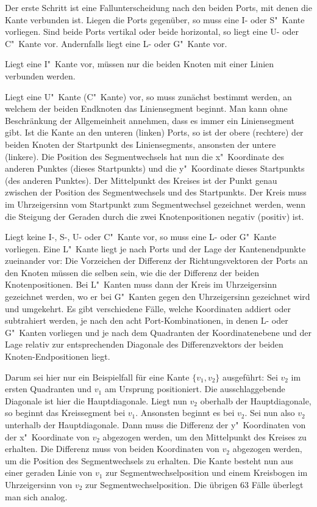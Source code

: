 \documentclass[a4paper]{scrreprt}
\theoremstyle{definition}
\begin{document}
Der erste Schritt ist eine Fallunterscheidung nach den beiden Ports, mit denen die Kante verbunden ist. Liegen die Ports gegenüber, so muss eine I- oder S"~Kante vorliegen. Sind beide Ports vertikal oder beide horizontal, so liegt eine U- oder C"~Kante vor. Andernfalls liegt eine L- oder G"~Kante vor.

Liegt eine I"~Kante vor, müssen nur die beiden Knoten mit einer Linien verbunden werden. %

Liegt eine U"~Kante (C"~Kante) vor, so muss zunächst bestimmt werden, an welchem der beiden Endknoten das Liniensegment beginnt. Man kann ohne Beschränkung der Allgemeinheit annehmen, dass es immer ein Liniensegment gibt. Ist die Kante an den unteren (linken) Ports, so ist der obere (rechtere) der beiden Knoten der Startpunkt des Liniensegments, ansonsten der untere  (linkere). Die Position des Segmentwechsels hat nun die x"~Koordinate des anderen Punktes (dieses Startpunkts) und die y"~Koordinate dieses Startpunkts (des anderen Punktes). Der Mittelpunkt des Kreises ist der Punkt genau zwischen der Position des Segmentwechsels und des Startpunkts. Der Kreis muss im Uhrzeigersinn vom Startpunkt zum Segmentwechsel gezeichnet werden, wenn die Steigung der Geraden durch die zwei Knotenpositionen negativ (positiv) ist.

Liegt keine I-, S-, U- oder C"~Kante vor, so muss eine L- oder G"~Kante vorliegen. Eine L"~Kante liegt je nach Ports und der Lage der Kantenendpunkte zueinander vor: Die Vorzeichen der Differenz der Richtungsvektoren der Ports an den Knoten müssen die selben sein, wie die der Differenz der beiden Knotenpositionen. Bei L"~Kanten muss dann der Kreis im Uhrzeigersinn gezeichnet werden, wo er bei G"~Kanten gegen den Uhrzeigersinn gezeichnet wird und umgekehrt. Es gibt verschiedene Fälle, welche Koordinaten addiert oder subtrahiert werden, je nach den acht Port-Kombinationen, in denen  L- oder G"~Kanten vorliegen und je nach dem Quadranten der Koordinatenebene und der Lage relativ zur entsprechenden Diagonale des Differenzvektors der beiden Knoten-Endpositionen liegt.

Darum sei hier nur ein Beispielfall für eine Kante $\{v_1, v_2\}$ ausgeführt: Sei $v_2$ im ersten Quadranten und $v_1$ am Ursprung positioniert. Die ausschlaggebende Diagonale ist hier die Hauptdiagonale. Liegt nun $v_2$ oberhalb der Hauptdiagonale, so beginnt das Kreissegment bei $v_1$. Ansonsten beginnt es bei $v_2$. Sei nun also $v_2$ unterhalb der Hauptdiagonale. Dann muss die Differenz der y"~Koordinaten von der x"~Koordinate von $v_2$ abgezogen werden, um den Mittelpunkt des Kreises zu erhalten. Die Differenz muss von beiden Koordinaten von $v_2$ abgezogen werden, um die Position des Segmentwechsels zu erhalten. Die Kante besteht nun aus einer geraden Linie von $v_1$ zur Segmentwechselposition und einem Kreisbogen im Uhrzeigersinn von $v_2$ zur Segmentwechselposition. Die übrigen 63 Fälle überlegt man sich analog.
\end{document}
